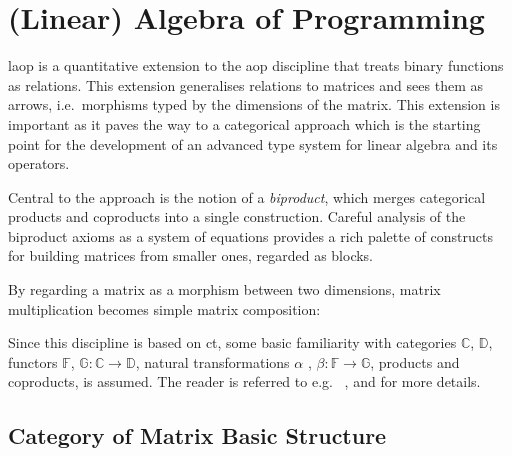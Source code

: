 \documentclass[
  oneside,
  11pt, a4paper,
  footinclude=true,
  headinclude=true,
  cleardoublepage=empty
]{scrbook}
\theoremstyle{definition}
\theoremstyle{definition}
\begin{document}
    
    \section{(Linear) Algebra of Programming}
    
    \gls{laop} is a quantitative extension to the  \gls{aop} discipline that treats binary functions as relations. This extension generalises relations to matrices and sees them as arrows, i.e.\ morphisms typed by the dimensions of the matrix. This extension is important as it paves the way to a categorical approach which is the starting point for the development of an advanced type system for linear algebra and its operators.
    
    Central to the approach is the notion of a \emph{biproduct}, which merges categorical products and coproducts into a single construction. Careful analysis of the biproduct axioms as a system of equations provides a rich palette of constructs for building matrices from smaller ones, regarded as blocks.
    
    By regarding a matrix as a morphism between two dimensions, matrix multiplication becomes simple matrix composition:
    
    \begin{center}
    \end{center}
    
    Since this discipline is based on \gls{ct}, some basic familiarity with categories $\mathbb{C}$, $\mathbb{D}$, functors $\mathbb{F}$, $\mathbb{G} : \mathbb{C} → \mathbb{D}$, natural transformations $\alpha$ , $\beta : \mathbb{F} → \mathbb{G}$, products and coproducts, is assumed. The reader is referred to e.g.\ %
    \citep{Awodey:2010:CT:2060081}, \citep{jno-5}
    and \citep{Macedo2012MatricesAA} for more details.
    
        \subsection{Category of Matrix Basic Structure}
        
\end{document}
